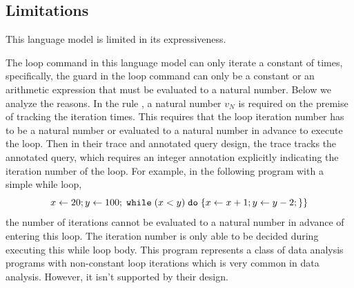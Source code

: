  
\subsection{Limitations}
This language model is limited in its expressiveness.
 
The loop command in this language model can only iterate a constant of times,
specifically, the guard in the loop command can only be a constant or an arithmetic expression that must be evaluated to a natural number.
Below we analyze the reasons.
In the rule , a natural number $v_N$ is required on the premise of tracking the iteration times.
This requires that the loop iteration number has to be a natural number or evaluated to a natural number in advance to execute the loop.
Then in their trace and annotated query design,
the trace tracks the annotated query, which requires an integer annotation explicitly indicating the iteration number of the loop. For example, in the following program with a simple while loop,
 \[
 {\mathrel{ x \leftarrow 20 }};
 \mathrel{ y \leftarrow 100 };
 \;\mathtt{while}\; (x < y) \;\mathtt{do}\; 
 \{
 \mathrel{ x \leftarrow x + 1 };
 \mathrel{ y \leftarrow y - 2 };
 \}\}
 \] 
 the number of iterations cannot be evaluated to a natural number in advance of entering this loop. 
 The iteration number is only
 able to be decided during executing this while loop body.
 This program represents a class of data analysis programs with non-constant loop iterations
 which is very common in data analysis. However, it isn't supported by their design.



 

